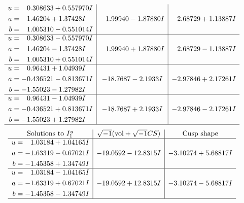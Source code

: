 \documentclass[1p]{elsarticle_modified}
\theoremstyle{definition}
\newcommand{\I}{\sqrt{-1}}
\begin{document}
$$\begin{array}{c|c|c}
\begin{aligned}
u &= \phantom{-}0.308633 + 0.557970 I \\
a &= \phantom{-}1.46204 + 1.37428 I \\
b &= \phantom{-}1.005310 - 0.551014 I\end{aligned}
 & \phantom{-}1.99940 - 1.87880 I & \phantom{-}2.68729 + 1.13887 I \\ \hline\begin{aligned}
u &= \phantom{-}0.308633 - 0.557970 I \\
a &= \phantom{-}1.46204 - 1.37428 I \\
b &= \phantom{-}1.005310 + 0.551014 I\end{aligned}
 & \phantom{-}1.99940 + 1.87880 I & \phantom{-}2.68729 - 1.13887 I \\ \hline\begin{aligned}
u &= \phantom{-}0.96431 + 1.04939 I \\
a &= -0.436521 - 0.813671 I \\
b &= -1.55023 - 1.27982 I\end{aligned}
 & -18.7687 - 2.1933 I & -2.97846 + 2.17261 I \\ \hline\begin{aligned}
u &= \phantom{-}0.96431 - 1.04939 I \\
a &= -0.436521 + 0.813671 I \\
b &= -1.55023 + 1.27982 I\end{aligned}
 & -18.7687 + 2.1933 I & -2.97846 - 2.17261 I\\
 \hline 
 \end{array}$$\newpage$$\begin{array}{c|c|c}  
\text{Solutions to }I^u_{1}& \I (\text{vol} + \sqrt{-1}CS) & \text{Cusp shape}\\
 \hline 
\begin{aligned}
u &= \phantom{-}1.03184 + 1.04165 I \\
a &= -1.63319 - 0.67021 I \\
b &= -1.45358 + 1.34749 I\end{aligned}
 & -19.0592 - 12.8315 I & -3.10274 + 5.68817 I \\ \hline\begin{aligned}
u &= \phantom{-}1.03184 - 1.04165 I \\
a &= -1.63319 + 0.67021 I \\
b &= -1.45358 - 1.34749 I\end{aligned}
 & -19.0592 + 12.8315 I & -3.10274 - 5.68817 I\\
 \hline 
 \end{array}$$\newpage\newpage\renewcommand{\arraystretch}{1}
\end{document}
